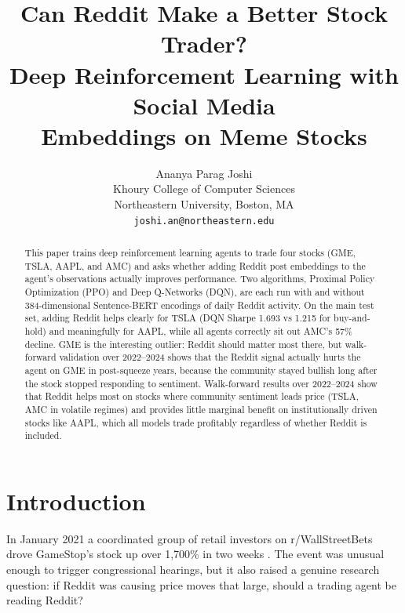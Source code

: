 \documentclass[letterpaper,twocolumn]{article}
\begin{document}
\title{\textbf{Can Reddit Make a Better Stock Trader?\\
Deep Reinforcement Learning with Social Media\\
Embeddings on Meme Stocks}}

\author{
  Ananya Parag Joshi \\
  {\small Khoury College of Computer Sciences} \\
  {\small Northeastern University, Boston, MA} \\
  {\small \texttt{joshi.an@northeastern.edu}}
}
\date{}
\maketitle

\begin{abstract}
This paper trains deep reinforcement learning agents to trade
four stocks (GME, TSLA, AAPL, and AMC) and asks whether
adding Reddit post embeddings to the agent's observations
actually improves performance.
Two algorithms, Proximal Policy Optimization (PPO) and
Deep Q-Networks (DQN), are each run with and without
384-dimensional Sentence-BERT encodings of daily Reddit
activity.
On the main test set, adding Reddit helps clearly for TSLA
(DQN Sharpe 1.693 vs 1.215 for buy-and-hold) and
meaningfully for AAPL, while all agents correctly sit out
AMC's 57\% decline.
GME is the interesting outlier: Reddit should matter most
there, but walk-forward validation over 2022--2024 shows
that the Reddit signal actually hurts the agent on GME in
post-squeeze years, because the community stayed bullish
long after the stock stopped responding to sentiment.
Walk-forward results over 2022--2024 show that Reddit helps
most on stocks where community sentiment leads price (TSLA,
AMC in volatile regimes) and provides little marginal benefit
on institutionally driven stocks like AAPL, which all models
trade profitably regardless of whether Reddit is included.
\end{abstract}

\section{Introduction}

In January 2021 a coordinated group of retail investors on
r/WallStreetBets drove GameStop's stock up over 1,700\%
in two weeks \citep{reddit2021gamestop}.
The event was unusual enough to trigger congressional hearings,
but it also raised a genuine research question: if Reddit was
causing price moves that large, should a trading agent be
reading Reddit?
\end{document}
